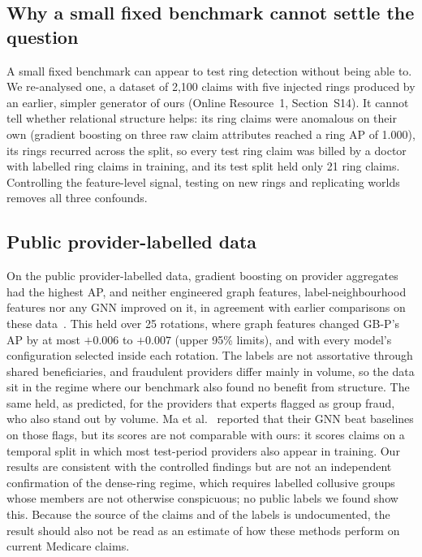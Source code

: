 \documentclass[pdflatex,sn-vancouver-num]{sn-jnl}
\newcommand{\SSecLegacy}{S14}\newcommand{\STabLegacy}{S11}
\begin{document}
\subsection{Why a small fixed benchmark cannot settle the question}\label{sec:legacy}
A small fixed benchmark can appear to test ring detection without being able to.
We re-analysed one, a dataset of 2{,}100 claims with five injected
rings produced by an earlier, simpler generator of ours (Online Resource~1,
Section~\SSecLegacy). It cannot tell whether relational structure helps: its ring
claims were anomalous on their own (gradient boosting on three raw claim
attributes reached a ring AP of 1.000), its rings recurred across the split,
so every test ring claim was billed by a doctor with labelled ring claims in
training, and its test split held only 21 ring claims. Controlling the
feature-level signal, testing on new rings and replicating worlds removes all
three confounds.

\subsection{Public provider-labelled data}
On the public provider-labelled data, gradient boosting on provider
aggregates had the highest AP, and neither engineered graph features,
label-neighbourhood features nor any GNN improved on it, in agreement with
earlier comparisons on these data~\cite{yoo2023,mardani2024}. This held over
25 rotations, where graph features changed GB-P's AP by at most $+0.006$ to
$+0.007$ (upper 95\% limits), and with every model's configuration selected
inside each rotation. The labels are
not assortative through shared beneficiaries, and fraudulent providers differ
mainly in volume, so the data sit in the regime where our benchmark also
found no benefit from structure. The same held, as predicted, for the providers
that experts flagged as group fraud, who also stand out by volume. Ma et
al.~\cite{ma2023rdpgl} reported that their GNN beat baselines on those flags,
but its scores are not comparable with ours: it scores claims on a temporal
split in which most test-period providers also appear in training. Our results
are consistent with the controlled findings but are not an independent
confirmation of the dense-ring regime, which requires labelled collusive groups
whose members are not otherwise conspicuous; no public labels we found show
this. Because the source of the claims and of the labels is
undocumented, the result should also not be read as an estimate of how these
methods perform on current Medicare claims.
\end{document}
